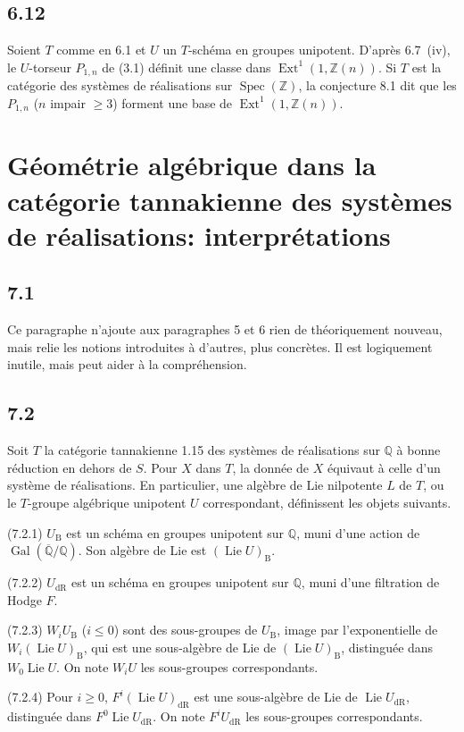 \documentclass[12pt,a4paper]{article}
\theoremstyle{plain}
\theoremstyle{definition}
\theoremstyle{remark}
\DeclareMathOperator{\Spec}{Spec}
\DeclareMathOperator{\Gal}{Gal}
\DeclareMathOperator{\Ext}{Ext}
\DeclareMathOperator{\Lie}{Lie}
\newcommand{\DR}{\mathrm{dR}}
\newcommand{\B}{\mathrm{B}}
\newcommand{\Z}{\mathbb{Z}}
\newcommand{\Q}{\mathbb{Q}}
\begin{document}
\subsection*{6.12}
Soient $T$ comme en 6.1 et $U$ un $T$-schéma en groupes unipotent. D'après 6.7~(iv), le $U$-torseur $P_{1,n}$ de (3.1) définit une classe dans $\Ext^1(1, 
\Z(n))$. Si $T$ est la catégorie des systèmes de réalisations sur $\Spec(\Z)$, la conjecture 8.1 dit que les $P_{1,n}$ ($n$ impair $\geq 3$) forment une base de $\Ext^1(1, 
\Z(n))$.

\section{Géométrie algébrique dans la catégorie tannakienne des systèmes de réalisations: interprétations}
\label{sec:7}

\subsection*{7.1}
Ce paragraphe n'ajoute aux paragraphes 5 et 6 rien de théoriquement nouveau, mais relie les notions introduites à d'autres, plus concrètes. Il est logiquement inutile, mais peut aider à la compréhension.

\subsection*{7.2}
Soit $T$ la catégorie tannakienne 1.15 des systèmes de réalisations sur $\Q$ à bonne réduction en dehors de $S$. Pour $X$ dans $T$, la donnée de $X$ équivaut à celle d'un système de réalisations. En particulier, une algèbre de Lie nilpotente $L$ de $T$, ou le $T$-groupe algébrique unipotent $U$ correspondant, définissent les objets suivants.

(7.2.1) $U_\B$ est un schéma en groupes unipotent sur $\Q$, muni d'une action de $\Gal(\overline{\Q}/\Q)$. Son algèbre de Lie est $(\Lie U)_\B$.

(7.2.2) $U_\DR$ est un schéma en groupes unipotent sur $\Q$, muni d'une filtration de Hodge $F$.

(7.2.3) $W_i U_\B$ ($i 
\leq 0$) sont des sous-groupes de $U_\B$, image par l'exponentielle de $W_i(\Lie U)_\B$, qui est une sous-algèbre de Lie de $(\Lie U)_\B$, distinguée dans $W_0 
\Lie U$. On note $W_i U$ les sous-groupes correspondants.

(7.2.4) Pour $i 
\geq 0$, $F^i(\Lie U)_\DR$ est une sous-algèbre de Lie de $\Lie U_\DR$, distinguée dans $F^0 
\Lie U_\DR$. On note $F^i U_\DR$ les sous-groupes correspondants.
\end{document}

